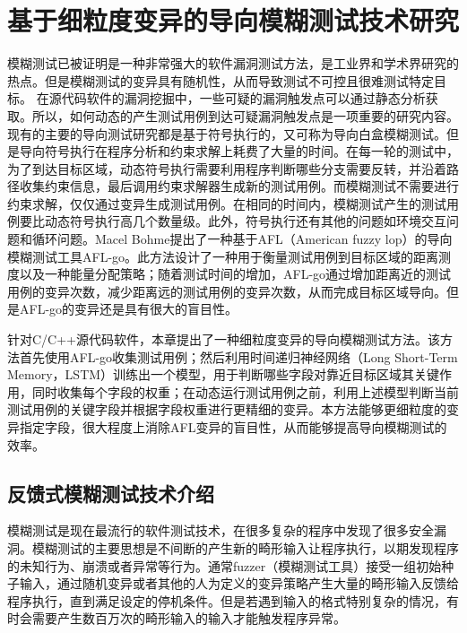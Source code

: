 \chapter{基于细粒度变异的导向模糊测试技术研究}

模糊测试已被证明是一种非常强大的软件漏洞测试方法，是工业界和学术界研究的热点。但是模糊测试的变异具有随机性，从而导致测试不可控且很难测试特定目标。
在源代码软件的漏洞挖掘中，一些可疑的漏洞触发点可以通过静态分析获取。所以，如何动态的产生测试用例到达可疑漏洞触发点是一项重要的研究内容。现有的主要的导向测试研究都是基于符号执行的，又可称为导向白盒模糊测试。但是导向符号执行在程序分析和约束求解上耗费了大量的时间。在每一轮的测试中，为了到达目标区域，动态符号执行需要利用程序判断哪些分支需要反转，并沿着路径收集约束信息，最后调用约束求解器生成新的测试用例。而模糊测试不需要进行约束求解，仅仅通过变异生成测试用例。在相同的时间内，模糊测试产生的测试用例要比动态符号执行高几个数量级。此外，符号执行还有其他的问题如环境交互问题和循环问题。Macel Bohme提出了一种基于AFL（American fuzzy lop）的导向模糊测试工具AFL-go。此方法设计了一种用于衡量测试用例到目标区域的距离测度以及一种能量分配策略；随着测试时间的增加，AFL-go通过增加距离近的测试用例的变异次数，减少距离远的测试用例的变异次数，从而完成目标区域导向。但是AFL-go的变异还是具有很大的盲目性。

针对C/C++源代码软件，本章提出了一种细粒度变异的导向模糊测试方法。该方法首先使用AFL-go收集测试用例；然后利用时间递归神经网络（Long Short-Term Memory，LSTM）训练出一个模型，用于判断哪些字段对靠近目标区域其关键作用，同时收集每个字段的权重；在动态运行测试用例之前，利用上述模型判断当前测试用例的关键字段并根据字段权重进行更精细的变异。本方法能够更细粒度的变异指定字段，很大程度上消除AFL变异的盲目性，从而能够提高导向模糊测试的效率。


\section{反馈式模糊测试技术介绍}\label{模糊测试介绍}

模糊测试是现在最流行的软件测试技术，在很多复杂的程序中发现了很多安全漏洞。模糊测试的主要思想是不间断的产生新的畸形输入让程序执行，以期发现程序的未知行为、崩溃或者异常等行为。通常fuzzer（模糊测试工具）接受一组初始种子输入，通过随机变异或者其他的人为定义的变异策略产生大量的畸形输入反馈给程序执行，直到满足设定的停机条件。但是若遇到输入的格式特别复杂的情况，有时会需要产生数百万次的畸形输入的输入才能触发程序异常。

